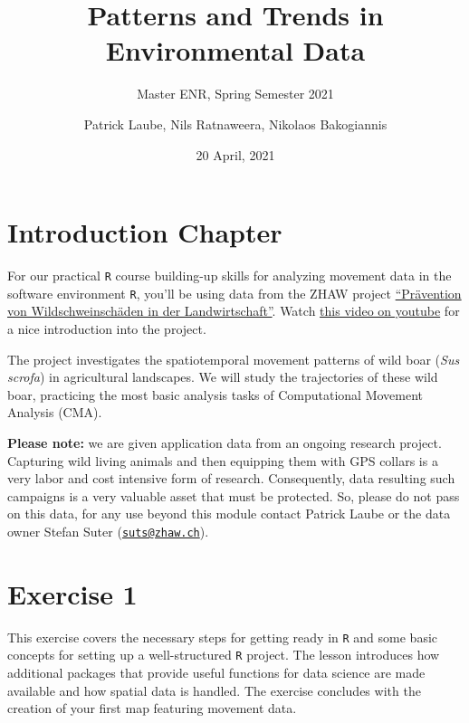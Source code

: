 \documentclass[
]{book}
\title{Patterns and Trends in Environmental Data}
\subtitle{Master ENR, Spring Semester 2021}
\author{Patrick Laube, Nils Ratnaweera, Nikolaos Bakogiannis}
\date{20 April, 2021}
\begin{document}
\maketitle

{
\setcounter{tocdepth}{1}
\tableofcontents
}
\hypertarget{introduction-chapter}{%
\chapter*{Introduction Chapter}\label{introduction-chapter}}

For our practical \texttt{R} course building-up skills for analyzing movement data in the software environment \texttt{R}, you'll be using data from the ZHAW project \href{https://www.zhaw.ch/de/ueber-uns/aktuell/news/detailansicht-news/event-news/wildschweinschaeden-mit-akustischer-methode-verhindern/}{``Prävention von Wildschweinschäden in der Landwirtschaft''}. Watch \href{https://youtu.be/WYXnCQMfPiI}{this video on youtube} for a nice introduction into the project.

The project investigates the spatiotemporal movement patterns of wild boar (\emph{Sus scrofa}) in agricultural landscapes. We will study the trajectories of these wild boar, practicing the most basic analysis tasks of Computational Movement Analysis (CMA).

\textbf{Please note:} we are given application data from an ongoing research project. Capturing wild living animals and then equipping them with GPS collars is a very labor and cost intensive form of research. Consequently, data resulting such campaigns is a very valuable asset that must be protected. So, please do not pass on this data, for any use beyond this module contact Patrick Laube or the data owner Stefan Suter (\href{mailto:suts@zhaw.ch}{\nolinkurl{suts@zhaw.ch}}).

\hypertarget{exercise-1}{%
\chapter{Exercise 1}\label{exercise-1}}

This exercise covers the necessary steps for getting ready in \texttt{R} and some basic concepts for setting up a well-structured \texttt{R} project. The lesson introduces how additional packages that provide useful functions for data science are made available and how spatial data is handled. The exercise concludes with the creation of your first map featuring movement data.
\end{document}
